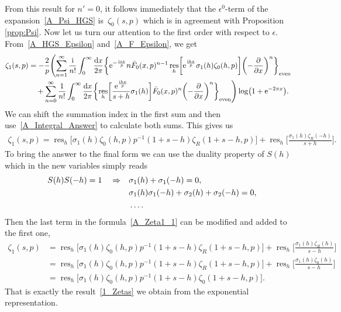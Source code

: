 \documentclass[10pt,a4paper]{amsart}
\numberwithin{equation}{section}
\DeclareMathOperator{\res}{res}
\begin{document}
From this result for $n'=0$, it follows immediately that the $\epsilon^0$-term of the expansion~\eqref{A_Psi_HGS} is~$\zeta_0(s, p)$ which is in agreement with Proposition \ref{prop:Psi}. Now let us turn our attention to the first order with respect to $\epsilon$. From~\eqref{A_HGS_Epsilon} and~\eqref{A_F_Epsilon}, we get
\begin{align*}
\zeta_1(s, p)
&=-\frac{2}{p}\Biggl( \sum_{n=1}^{\infty} \frac{{\rm i}}{n!} \int_{0}^{\infty} \frac{{\rm d}x}{2\pi}
\biggl\{
    {\rm e}^{-\frac{{\rm i}sx}{p}} n \bar{F}_0(x, p)^{n-1} \res_h\biggl[ {\rm e}^{\frac{{\rm i}hx}{p}} \sigma_1(h)\zeta_0(h, p) \biggr]
    \biggl(-\frac{\partial}{\partial x}\biggr)^{n}
\biggr\}_{\text{even}}\cr
&\quad{}+\sum_{n=0}^{\infty} \frac{1}{n!} \int_{0}^{\infty} \frac{{\rm d}x}{2\pi}
\biggl\{
    \res_h\biggl[\frac{{\rm e}^{\frac{{\rm i}hx}{p}}}{s+h}\sigma_1(h)\biggr] \bar{F}_0(x, p)^n
    \biggl(-\frac{\partial}{\partial x}\biggr)^{n}
\biggr\}_{\text{even}}\Biggr) \log\bigl(1+{\rm e}^{-2\pi x}\bigr).
\end{align*}
We can shift the summation index in the first sum and then use~\eqref{A_Integral_Answer} to calculate both sums. This gives us
\begin{align}\label{A_Zeta1_1}
\zeta_1(s, p)=\res_h\big[ \sigma_1(h)\zeta_0(h, p) p^{-1} (1+s-h) \zeta_R(1+s-h, p) \big] + \res_h\biggl[ \frac{\sigma_1(h)\zeta_R(-h)}{s+h} \biggr].
\end{align}
To bring the answer to the final form we can use the duality property of $S(h)$ which in the new variables simply reads
\begin{align}
S(h)S(-h)=1 \quad\Rightarrow\quad &\sigma_1(h)+\sigma_1(-h)=0, \nonumber\\
                             &\sigma_1(h)\sigma_1(-h)+\sigma_2(h)+\sigma_2(-h)=0, \cr
                             &\ldots.\label{A_S_Duality}
\end{align}
Then the last term in the formula~\eqref{A_Zeta1_1} can be modified and added to the first one,
\begin{align*}
\zeta_1(s, p)&{}=\res_h\bigl[ \sigma_1(h)\zeta_0(h, p) p^{-1} (1+s-h) \zeta_R(1+s-h, p) \bigr] + \res_h\biggl[ \frac{\sigma_1(h)\zeta_R(h)}{s-h} \biggr]  \\
&{}=\res_h\bigl[ \sigma_1(h)\zeta_0(h, p) p^{-1} (1+s-h) \zeta_R(1+s-h, p) \bigr] + \res_h\biggl[ \frac{\sigma_1(h)\zeta_0(h)}{s-h} \biggr]\\
&{}=\res_h\bigl[ \sigma_1(h)\zeta_0(h, p) p^{-1} (1+s-h) \zeta_0(1+s-h, p) \bigr].
\end{align*}
That is exactly the result~\eqref{1_Zetas} we obtain from the exponential representation.
\end{document}
